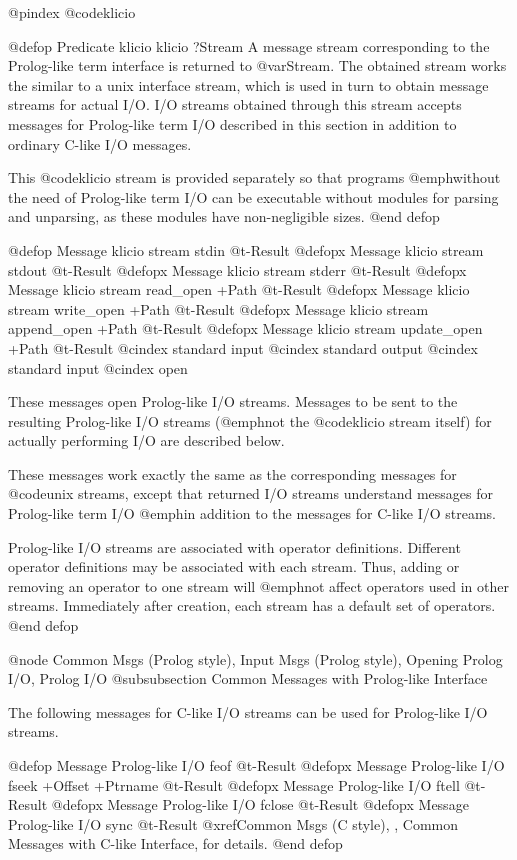 {{{{@pindex @code{klicio}

@defop {Predicate} {klicio} klicio ?Stream
A message stream corresponding to the Prolog-like term interface is
returned to @var{Stream}.  The obtained stream works the similar to a
unix interface stream, which is used in turn to obtain message streams
for actual I/O.  I/O streams obtained through this stream accepts
messages for Prolog-like term I/O described in this section in addition
to ordinary C-like I/O messages.

This @code{klicio} stream is provided separately so that programs
@emph{without} the need of Prolog-like term I/O can be executable
without modules for parsing and unparsing, as these modules have
non-negligible sizes.
@end defop

@defop {Message} {klicio stream} stdin @t{-}Result
@defopx {Message} {klicio stream} stdout @t{-}Result
@defopx {Message} {klicio stream} stderr @t{-}Result
@defopx {Message} {klicio stream} read_open +Path @t{-}Result
@defopx {Message} {klicio stream} write_open +Path @t{-}Result
@defopx {Message} {klicio stream} append_open +Path @t{-}Result
@defopx {Message} {klicio stream} update_open +Path @t{-}Result
@cindex standard input
@cindex standard output
@cindex standard input
@cindex open

These messages open Prolog-like I/O streams.  Messages to be sent to the
resulting Prolog-like I/O streams (@emph{not} the @code{klicio} stream
itself) for actually performing I/O are described below.

These messages work exactly the same as the corresponding messages for
@code{unix} streams, except that returned I/O streams understand
messages for Prolog-like term I/O @emph{in addition to} the messages for
C-like I/O streams.

Prolog-like I/O streams are associated with operator definitions.
Different operator definitions may be associated with each stream.
Thus, adding or removing an operator to one stream will @emph{not}
affect operators used in other streams.  Immediately after creation,
each stream has a default set of operators.
@end defop

@node Common Msgs (Prolog style), Input Msgs (Prolog style), Opening Prolog I/O, Prolog I/O
@subsubsection Common Messages with Prolog-like Interface

The following messages for C-like I/O streams can be used for
Prolog-like I/O streams.

@defop {Message} {Prolog-like I/O} feof @t{-}Result
@defopx {Message} {Prolog-like I/O} fseek +Offset +Ptrname @t{-}Result
@defopx {Message} {Prolog-like I/O} ftell @t{-}Result
@defopx {Message} {Prolog-like I/O} fclose @t{-}Result
@defopx {Message} {Prolog-like I/O} sync @t{-}Result
@xref{Common Msgs (C style), , Common Messages with C-like Interface},
for details.
@end defop

}}}}
